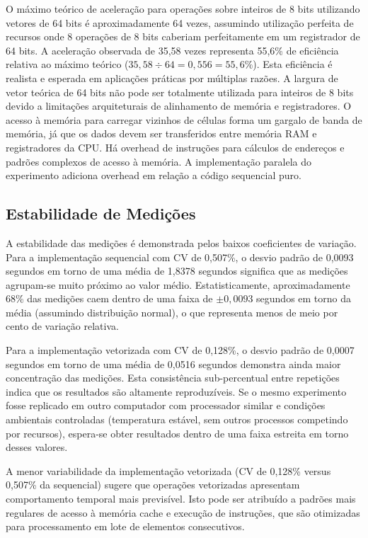 \documentclass[12pt]{article}
\begin{document}
O máximo teórico de aceleração para operações sobre inteiros de 8 bits utilizando vetores de 64 bits é aproximadamente 64 vezes, assumindo utilização perfeita de recursos onde 8 operações de 8 bits caberiam perfeitamente em um registrador de 64 bits. A aceleração observada de 35,58 vezes representa 55,6\% de eficiência relativa ao máximo teórico ($35,58 \div 64 = 0,556 = 55,6\%$). Esta eficiência é realista e esperada em aplicações práticas por múltiplas razões. A largura de vetor teórica de 64 bits não pode ser totalmente utilizada para inteiros de 8 bits devido a limitações arquiteturais de alinhamento de memória e registradores. O acesso à memória para carregar vizinhos de células forma um gargalo de banda de memória, já que os dados devem ser transferidos entre memória RAM e registradores da CPU. Há overhead de instruções para cálculos de endereços e padrões complexos de acesso à memória. A implementação paralela do experimento adiciona overhead em relação a código sequencial puro.

\subsection{Estabilidade de Medições}

A estabilidade das medições é demonstrada pelos baixos coeficientes de variação. Para a implementação sequencial com CV de 0,507\%, o desvio padrão de 0,0093 segundos em torno de uma média de 1,8378 segundos significa que as medições agrupam-se muito próximo ao valor médio. Estatisticamente, aproximadamente 68\% das medições caem dentro de uma faixa de $\pm 0,0093$ segundos em torno da média (assumindo distribuição normal), o que representa menos de meio por cento de variação relativa.

Para a implementação vetorizada com CV de 0,128\%, o desvio padrão de 0,0007 segundos em torno de uma média de 0,0516 segundos demonstra ainda maior concentração das medições. Esta consistência sub-percentual entre repetições indica que os resultados são altamente reproduzíveis. Se o mesmo experimento fosse replicado em outro computador com processador similar e condições ambientais controladas (temperatura estável, sem outros processos competindo por recursos), espera-se obter resultados dentro de uma faixa estreita em torno desses valores.

A menor variabilidade da implementação vetorizada (CV de 0,128\% versus 0,507\% da sequencial) sugere que operações vetorizadas apresentam comportamento temporal mais previsível. Isto pode ser atribuído a padrões mais regulares de acesso à memória cache e execução de instruções, que são otimizadas para processamento em lote de elementos consecutivos.
\end{document}

